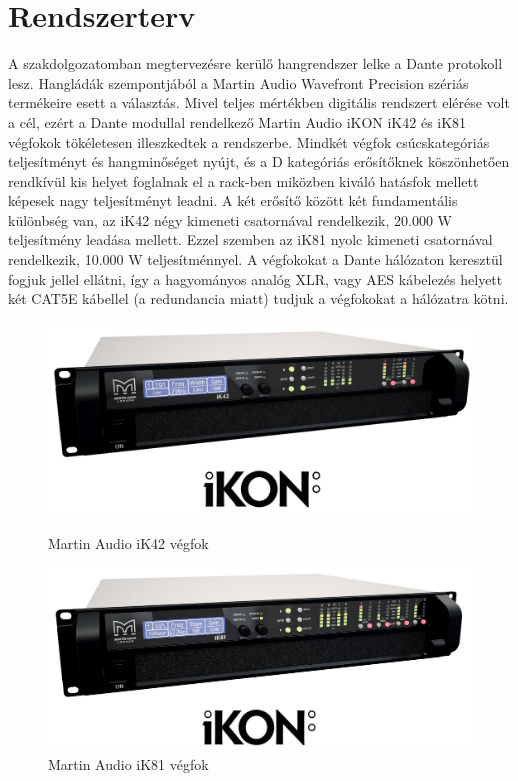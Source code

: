 \section{Rendszerterv}
A szakdolgozatomban megtervezésre kerülő hangrendszer lelke a Dante protokoll lesz.
Hangládák szempontjából a Martin Audio Wavefront Precision szériás termékeire esett a választás.
Mivel teljes mértékben digitális rendszert elérése volt a cél, ezért a Dante modullal
rendelkező Martin Audio iKON iK42 és iK81 végfokok tökéletesen illeszkedtek a rendszerbe.
Mindkét végfok csúcskategóriás teljesítményt és hangminőséget nyújt, és a D kategóriás
erősítőknek köszönhetően rendkívül kis helyet foglalnak el a rack-ben miközben kiváló hatásfok
mellett képesek nagy teljesítményt leadni. A két erősítő között két fundamentális különbség van,
az iK42 négy kimeneti csatornával rendelkezik, 20.000 W teljesítmény leadása mellett. 
Ezzel szemben az iK81 nyolc kimeneti csatornával rendelkezik, 10.000 W teljesítménnyel. \cite{IKONAMPUSEGUIDE}
A végfokokat a Dante hálózaton keresztül fogjuk jellel ellátni, így a hagyományos analóg XLR, vagy AES kábelezés helyett
két CAT5E kábellel (a redundancia miatt) tudjuk a végfokokat a hálózatra kötni. 
\begin{figure}[H]
    \centering
    \begin{minipage}{0.45\textwidth}
        \centering
        \includegraphics[width=\linewidth, keepaspectratio]{figures/ikon_ik42.jpg}
        \caption{Martin Audio iK42 végfok}\label{fig:ikon_ik42}
    \end{minipage}\hfill
    \begin{minipage}{0.45\textwidth}
        \centering
        \includegraphics[width=\linewidth, keepaspectratio]{figures/ikon_ik81.jpg}
        \caption{Martin Audio iK81 végfok}\label{fig:ikon_ik81}
    \end{minipage}
\end{figure}
